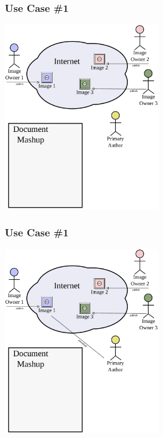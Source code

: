 \documentclass[mathserif,xcolor=dvipsnames,hyperref={bookmarks=true}]{beamer}
\begin{document}
    \begin{frame}[t]
        \frametitle{Use Case \#1}
        \begin{center}
            \includegraphics[width=0.51\textwidth]{../resources/usecases/usecase1/usecase1-step12.pdf}
        \end{center}
    \end{frame}
    \begin{frame}[t]
        \frametitle{Use Case \#1}
        \begin{center}
            \includegraphics[width=0.51\textwidth]{../resources/usecases/usecase1/usecase1-step13.pdf}
        \end{center}
    \end{frame}
\end{document}
